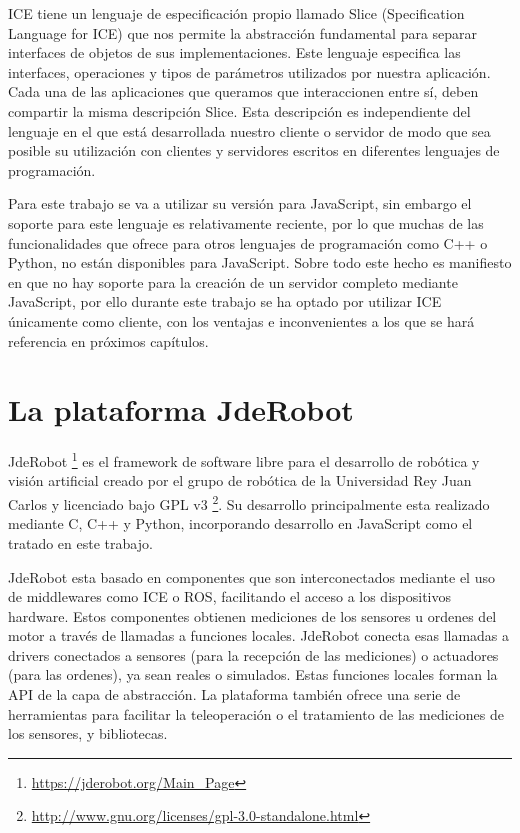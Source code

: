 ICE tiene un lenguaje de especificación propio llamado Slice (Specification Language for ICE) que nos permite la abstracción fundamental para separar interfaces de objetos de sus implementaciones. Este lenguaje especifica las interfaces, operaciones y tipos de parámetros utilizados por nuestra aplicación. Cada una de las aplicaciones que queramos que interaccionen entre sí, deben compartir la misma descripción Slice. Esta descripción es independiente del lenguaje en el que está desarrollada nuestro cliente o servidor de modo que sea posible su utilización con clientes y servidores escritos en diferentes lenguajes de programación.

Para este trabajo se va a utilizar su versión para JavaScript, sin embargo el soporte para este lenguaje es relativamente reciente, por lo que muchas de las funcionalidades que ofrece para otros lenguajes de programación como C++ o Python, no están disponibles para JavaScript. Sobre todo este hecho es manifiesto en que no hay soporte para la creación de un servidor completo mediante JavaScript, por ello durante este trabajo se ha optado por utilizar ICE únicamente como cliente, con los ventajas e inconvenientes a los que se hará referencia en próximos capítulos.

\section{La plataforma JdeRobot}
JdeRobot \footnote{\url{https://jderobot.org/Main_Page}} es el framework de software libre para el desarrollo de robótica y visión artificial creado por el grupo de robótica de la Universidad Rey Juan Carlos y licenciado bajo GPL v3 \footnote{\url{http://www.gnu.org/licenses/gpl-3.0-standalone.html}}. Su desarrollo principalmente esta realizado mediante C, C++ y Python, incorporando desarrollo en JavaScript como el tratado en este trabajo.

JdeRobot esta basado en componentes que son interconectados mediante el uso de middlewares como ICE o ROS, facilitando el acceso a los dispositivos hardware. Estos componentes obtienen mediciones  de los sensores u ordenes del motor a través de llamadas a funciones locales. JdeRobot conecta esas llamadas a drivers conectados a sensores (para la recepción de las mediciones) o actuadores (para las ordenes), ya sean reales o simulados. Estas funciones locales forman la API de la capa de abstracción. La plataforma también ofrece una serie de herramientas para facilitar la teleoperación o el tratamiento de las mediciones de los sensores, y bibliotecas.

